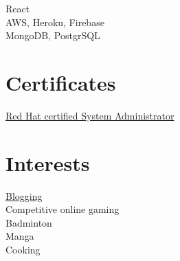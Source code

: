 \documentclass[]{Kushagra-build}
\begin{document}
\begin{minipage}[t]{0.29\textwidth}
React \\

AWS, Heroku, Firebase \\
MongoDB, PostgrSQL \\

\sectionsep

\section{Certificates}
\href{https://rhtapps.redhat.com/certifications/badge/verify/JBADVLBCAISWJFM6KOGIYCQ6PYAEQU3CUPSQX2KSDXT6RW46LQ3T7ULZ55KZZ56SKO7EQ3ETTLYZQ4U5NQYTCNA62RUWOCM34WWBUYQ=}{Red Hat certified System Administrator} \\
\sectionsep


\section{Interests}
    \href{https://dev.to/kushagra_mehta}{Blogging} \\
    Competitive online gaming \\
    Badminton \\
    Manga \\
    Cooking \\
\sectionsep



\sectionsep
{}

%
%
\end{minipage} 
\hfill
\end{document}
